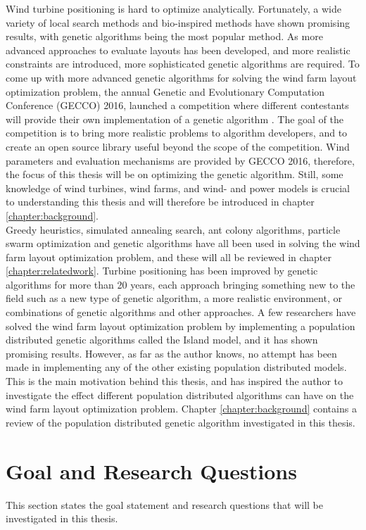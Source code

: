 \noindent Wind turbine positioning is hard to optimize analytically. Fortunately, a wide variety of local search methods and bio-inspired methods have shown promising results, with genetic algorithms being the most popular method. As more advanced approaches to evaluate layouts has been developed, and more realistic constraints are introduced, more sophisticated genetic algorithms are required. To come up with more advanced genetic algorithms for solving the wind farm layout optimization problem, the annual Genetic and Evolutionary Computation Conference (GECCO) 2016, launched a competition where different contestants will provide their own implementation of a genetic algorithm \citep{url2}. The goal of the competition is to bring more realistic problems to algorithm developers, and to create an open source library useful beyond the scope of the competition. Wind parameters and evaluation mechanisms are provided by GECCO 2016, therefore, the focus of this thesis will be on optimizing the genetic algorithm. Still, some knowledge of wind turbines, wind farms, and wind- and power models is crucial to understanding this thesis and will therefore be introduced in chapter \ref{chapter:background}. \\

\noindent Greedy heuristics, simulated annealing search, ant colony algorithms, particle swarm optimization and genetic algorithms have all been used in solving the wind farm layout optimization problem, and these will all be reviewed in chapter \ref{chapter:relatedwork}. Turbine positioning has been improved by genetic algorithms for more than 20 years, each approach bringing something new to the field such as a new type of genetic algorithm, a more realistic environment, or combinations of genetic algorithms and other approaches. A few researchers have solved the wind farm layout optimization problem by implementing a population distributed genetic algorithms called the Island model, and it has shown promising results. However, as far as the author knows, no attempt has been made in implementing any of the other existing population distributed models. This is the main motivation behind this thesis, and has inspired the author to investigate the effect different population distributed algorithms can have on the wind farm layout optimization problem. Chapter \ref{chapter:background} contains a review of the population distributed genetic algorithm investigated in this thesis.


\section{Goal and Research Questions}\label{section:goal&researchquestions}
This section states the goal statement and research questions that will be investigated in this thesis. \\

